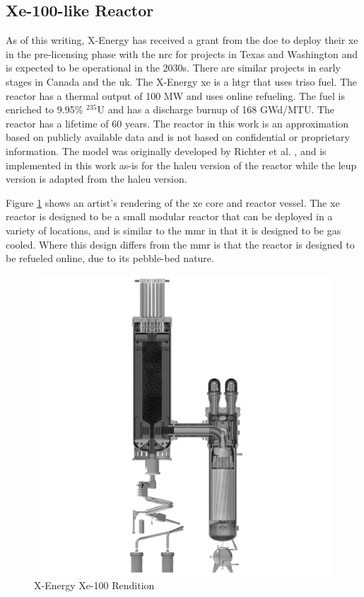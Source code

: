 \subsection{Xe-100-like Reactor}
\label{sec:xe}

As of this writing, X-Energy has received a grant from the \gls{doe} to deploy their \gls{xe} in the pre-licensing phase with the \gls{nrc} for projects in Texas and Washington and is expected to be operational in the 2030s. There are similar projects in early stages in Canada and the \gls{uk}. The X-Energy \gls{xe} is a \gls{htgr} that uses \gls{triso} fuel. The reactor has a thermal output of 100 MW and uses online refueling. The fuel is enriched to 9.95\% $^{235}$U and has a discharge burnup of 168 GWd/MTU. The reactor has a lifetime of 60 years. The reactor in this work is an approximation based on publicly available data and is not based on confidential or proprietary information. The model was originally developed by Richter et al. \cite{richter_xe100_like}, and is implemented in this work as-is for the \gls{haleu} version of the reactor while the \gls{leup} version is adapted from the \gls{haleu} version.

Figure \ref{fig:xe_design} shows an artist's rendering of the \gls{xe} core and reactor vessel. The \gls{xe} reactor is designed to be a small modular reactor that can be deployed in a variety of locations, and is similar to the \gls{mmr} in that it is designed to be gas cooled. Where this design differs from the \gls{mmr} is that the reactor is designed to be refueled online, due to its pebble-bed nature.

\begin{figure}[H]
    \centering
    \includegraphics[scale=0.09]{images/reactor_design/xe-100-reactor-slice.jpg}
    \caption{X-Energy Xe-100 Rendition \cite{xe_reactor}}
    \label{fig:xe_design}
\end{figure}

